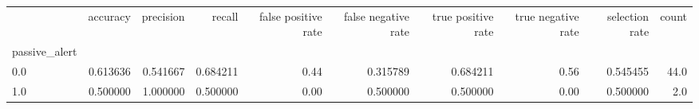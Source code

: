 \begin{tabular}{lrrrrrrrrr}
\toprule
{} &  accuracy &  precision &    recall &  false positive rate &  false negative rate &  true positive rate &  true negative rate &  selection rate &  count \\
passive\_alert &           &            &           &                      &                      &                     &                     &                 &        \\
\midrule
0.0           &  0.613636 &   0.541667 &  0.684211 &                 0.44 &             0.315789 &            0.684211 &                0.56 &        0.545455 &   44.0 \\
1.0           &  0.500000 &   1.000000 &  0.500000 &                 0.00 &             0.500000 &            0.500000 &                0.00 &        0.500000 &    2.0 \\
\bottomrule
\end{tabular}
